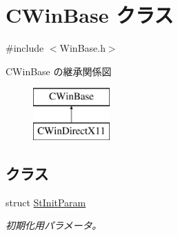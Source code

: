 \hypertarget{class_c_win_base}{}\section{C\+Win\+Base クラス}
\label{class_c_win_base}


{\ttfamily \#include $<$Win\+Base.\+h$>$}

C\+Win\+Base の継承関係図\begin{figure}[H]
\begin{center}
\leavevmode
\includegraphics[height=2.000000cm]{class_c_win_base}
\end{center}
\end{figure}
\subsection*{クラス}
\begin{DoxyCompactItemize}
\item 
struct \hyperlink{struct_c_win_base_1_1_st_init_param}{St\+Init\+Param}
\begin{DoxyCompactList}\small\item\em 初期化用パラメータ。 \end{DoxyCompactList}\end{DoxyCompactItemize}
